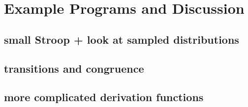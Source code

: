 \chapter{Example Programs and Discussion}

\section{small Stroop + look at sampled distributions}
\section{transitions and congruence}
\section{more complicated derivation functions}
